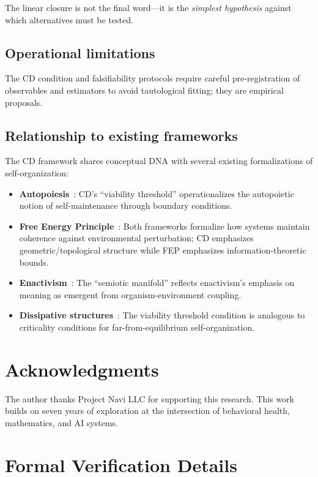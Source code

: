 \documentclass[11pt]{article}
\theoremstyle{plain}
\theoremstyle{definition}
\theoremstyle{remark}
\begin{document}
The linear closure is not the final word---it is the \emph{simplest hypothesis} against which alternatives must be tested.

\subsection*{Operational limitations}
The CD condition and falsifiability protocols require careful pre-registration of observables and estimators to avoid tautological fitting; they are empirical proposals.

\subsection*{Relationship to existing frameworks}
The CD framework shares conceptual DNA with several existing formalizations of self-organization:
\begin{itemize}
\item \textbf{Autopoiesis}~\cite{MaturanaVarela1980}: CD's ``viability threshold'' operationalizes the autopoietic notion of self-maintenance through boundary conditions.
\item \textbf{Free Energy Principle}~\cite{Friston2010}: Both frameworks formalize how systems maintain coherence against environmental perturbation; CD emphasizes geometric/topological structure while FEP emphasizes information-theoretic bounds.
\item \textbf{Enactivism}~\cite{Varela1991,Thompson2007}: The ``semiotic manifold'' reflects enactivism's emphasis on meaning as emergent from organism-environment coupling.
\item \textbf{Dissipative structures}~\cite{Prigogine1984}: The viability threshold condition is analogous to criticality conditions for far-from-equilibrium self-organization.
\end{itemize}

\section*{Acknowledgments}
The author thanks Project Navi LLC for supporting this research. This work builds on seven years of exploration at the intersection of behavioral health, mathematics, and AI systems.

\appendix
\section{Formal Verification Details}\label{app:verification}
\end{document}
